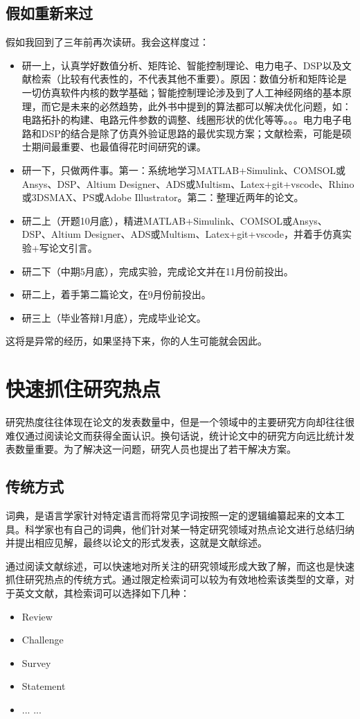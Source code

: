 \documentclass[UTF8]{ctexbook}
\begin{document}
\section{假如重新来过}
假如我回到了三年前再次读研。我会这样度过：
\begin{itemize}
	\item 研一上，认真学好数值分析、矩阵论、智能控制理论、电力电子、DSP以及文献检索（比较有代表性的，不代表其他不重要）。原因：数值分析和矩阵论是一切仿真软件内核的数学基础；智能控制理论涉及到了人工神经网络的基本原理，而它是未来的必然趋势，此外书中提到的算法都可以解决优化问题，如：电路拓扑的构建、电路元件参数的调整、线圈形状的优化等等。。。电力电子电路和DSP的结合是除了仿真外验证思路的最优实现方案；文献检索，可能是硕士期间最重要、也最值得花时间研究的课。
	\item 研一下，只做两件事。第一：系统地学习MATLAB+Simulink、COMSOL或Ansys、DSP、Altium Designer、ADS或Multism、Latex+git+vscode、Rhino或3DSMAX、PS或Adobe Illustrator。第二：整理近两年的论文。
	\item 研二上（开题10月底），精进MATLAB+Simulink、COMSOL或Ansys、DSP、Altium Designer、ADS或Multism、Latex+git+vscode，并着手仿真实验+写论文引言。
	\item 研二下（中期5月底），完成实验，完成论文并在11月份前投出。
	\item 研二上，着手第二篇论文，在9月份前投出。
	\item 研三上（毕业答辩1月底），完成毕业论文。
\end{itemize}

这将是异常的经历，如果坚持下来，你的人生可能就会因此。


\chapter{快速抓住研究热点}
研究热度往往体现在论文的发表数量中，但是一个领域中的主要研究方向却往往很难仅通过阅读论文而获得全面认识。换句话说，统计论文中的研究方向远比统计发表数量重要。为了解决这一问题，研究人员也提出了若干解决方案。

\section{传统方式}
词典，是语言学家针对特定语言而将常见字词按照一定的逻辑编纂起来的文本工具。科学家也有自己的词典，他们针对某一特定研究领域对热点论文进行总结归纳并提出相应见解，最终以论文的形式发表，这就是文献综述。

通过阅读文献综述，可以快速地对所关注的研究领域形成大致了解，而这也是快速抓住研究热点的传统方式。通过限定检索词可以较为有效地检索该类型的文章，对于英文文献，其检索词可以选择如下几种：
\begin{itemize}
	\item Review
	\item Challenge
	\item Survey
	\item Statement
	\item ... ...
\end{itemize}
\end{document}
